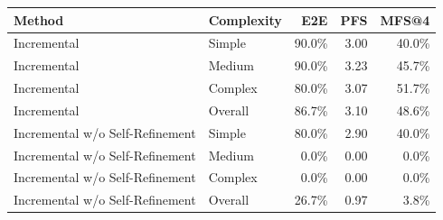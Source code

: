 \begin{tabular}{llrrr}
\toprule
Method & Complexity & E2E & PFS & MFS@4 \\
\midrule
Incremental & Simple & 90.0\% & 3.00 & 40.0\% \\
Incremental & Medium & 90.0\% & 3.23 & 45.7\% \\
Incremental & Complex & 80.0\% & 3.07 & 51.7\% \\
Incremental & Overall & 86.7\% & 3.10 & 48.6\% \\
Incremental w/o Self-Refinement & Simple & 80.0\% & 2.90 & 40.0\% \\
Incremental w/o Self-Refinement & Medium & 0.0\% & 0.00 & 0.0\% \\
Incremental w/o Self-Refinement & Complex & 0.0\% & 0.00 & 0.0\% \\
Incremental w/o Self-Refinement & Overall & 26.7\% & 0.97 & 3.8\% \\
\bottomrule
\end{tabular}
